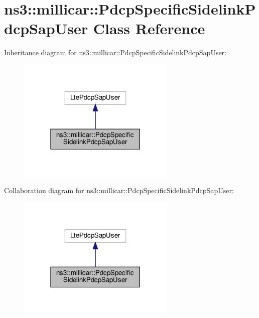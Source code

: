 \hypertarget{classns3_1_1millicar_1_1PdcpSpecificSidelinkPdcpSapUser}{}\section{ns3\+:\+:millicar\+:\+:Pdcp\+Specific\+Sidelink\+Pdcp\+Sap\+User Class Reference}
\label{classns3_1_1millicar_1_1PdcpSpecificSidelinkPdcpSapUser}


Inheritance diagram for ns3\+:\+:millicar\+:\+:Pdcp\+Specific\+Sidelink\+Pdcp\+Sap\+User\+:
\nopagebreak
\begin{figure}[H]
\begin{center}
\leavevmode
\includegraphics[width=213pt]{classns3_1_1millicar_1_1PdcpSpecificSidelinkPdcpSapUser__inherit__graph}
\end{center}
\end{figure}


Collaboration diagram for ns3\+:\+:millicar\+:\+:Pdcp\+Specific\+Sidelink\+Pdcp\+Sap\+User\+:
\nopagebreak
\begin{figure}[H]
\begin{center}
\leavevmode
\includegraphics[width=213pt]{classns3_1_1millicar_1_1PdcpSpecificSidelinkPdcpSapUser__coll__graph}
\end{center}
\end{figure}
